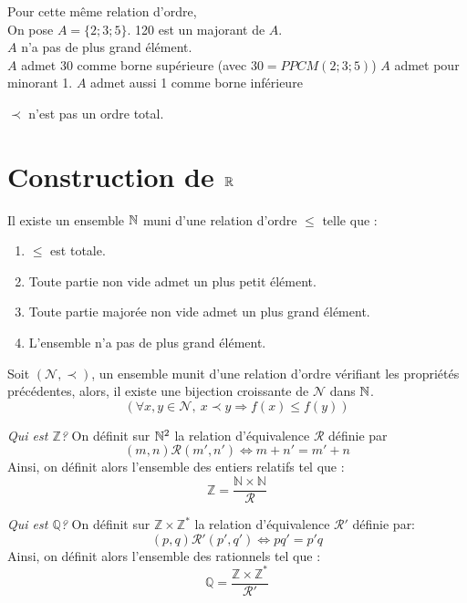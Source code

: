 \documentclass[../main.tex]{subfile}
\begin{document}
\begin{ex}
\begin{itemize}
		$\phantom{a}$\\
		Pour cette même relation d'ordre,\\
		On pose $A = \{2; 3; 5\}$.
		120 est un majorant de $A$.\\
		$A$ n'a pas de plus grand élément.\\
		$A$ admet 30 comme borne supérieure (avec $30 = PPCM(2;3;5)$)
		$A$ admet pour minorant 1.
		$A$ admet aussi 1 comme borne inférieure
		\begin{rema}
			$\prec$ n'est pas un ordre total.
		\end{rema}
	\end{itemize}
\end{ex}

\section{Construction de $\mathbb{R}$}

\begin{axiome}
	Il existe un ensemble $\mathbb{N}$ muni d'une relation d'ordre $\leq$ telle que :
	\begin{enumerate}
		\item $\leq$ est totale.
		\item Toute partie non vide admet un plus petit élément.
		\item Toute partie majorée non vide admet un plus grand élément.
		\item L'ensemble n'a pas de plus grand élément.
	\end{enumerate}
\end{axiome}

\begin{theo}
	Soit $(\mathcal{N}, \prec)$, un ensemble munit d'une relation d'ordre vérifiant les propriétés précédentes, alors, il existe une bijection croissante de $\mathcal{N}$ dans $\mathbb{N}$.
	$$(\forall x, y \in \mathcal{N}, \ x \prec y \Rightarrow f(x) \leq f(y))$$

\end{theo}

\emph{Qui est $\mathbb{Z}$?}
On définit sur $\mathbb{N}^2$ la relation d'équivalence $\mathcal{R}$ définie par 
$$(m,n) \mathcal{R} (m', n') \Leftrightarrow m + n' = m' + n$$
Ainsi, on définit alors l'ensemble des entiers relatifs tel que :
$$\mathbb{Z} = \frac{\mathbb{N} \times \mathbb{N}}{\mathcal{R}}$$

\emph{Qui est $\mathbb{Q}$?}
On définit sur $\mathbb{Z} \times \mathbb{Z}^*$ la relation d'équivalence $\mathcal{R}'$ définie par:
$$(p, q) \mathcal{R}' (p', q') \Leftrightarrow pq' = p'q$$
Ainsi, on définit alors l'ensemble des rationnels tel que :
$$\mathbb{Q} = \frac{\mathbb{Z} \times \mathbb{Z}^*}{\mathcal{R}'}$$
\end{document}
